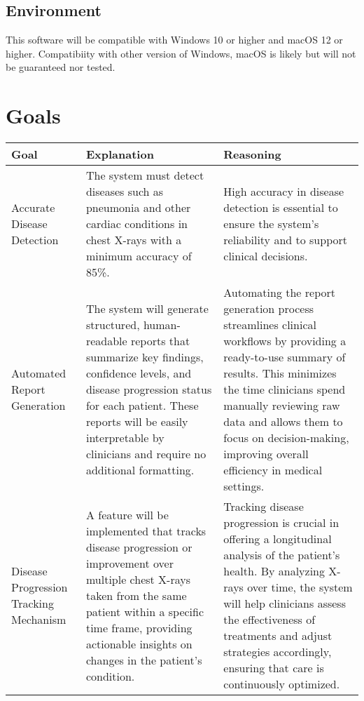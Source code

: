 \documentclass{article}
\begin{document}
\subsection{Environment}
This software will be compatible with Windows 10 or higher and macOS 12 or higher. Compatibiity with other version of Windows, macOS is likely but will not be guaranteed nor tested.\\

\newpage
\section{Goals}
\begin{table}[H] %
    \hspace*{-2cm}
    \centering
    \begin{tabular}{|p{3cm}|p{6cm}|p{6cm}|}
    \hline
    \textbf{Goal} & \textbf{Explanation} & \textbf{Reasoning} \\ \hline
    Accurate Disease Detection & The system must detect diseases such as pneumonia and other cardiac conditions in chest X-rays with a minimum accuracy of 85\%. & High accuracy in disease detection is essential to ensure the system’s reliability and to support clinical decisions. \\ \hline

    Automated Report Generation & The system will generate structured, human-readable reports that summarize key findings, confidence levels, and disease progression status for each patient. These reports will be easily interpretable by clinicians and require no additional formatting. & Automating the report generation process streamlines clinical workflows by providing a ready-to-use summary of results. This minimizes the time clinicians spend manually reviewing raw data and allows them to focus on decision-making, improving overall efficiency in medical settings. \\ \hline
    
    Disease Progression Tracking Mechanism & A feature will be implemented that tracks disease progression or improvement over multiple chest X-rays taken from the same patient within a specific time frame, providing actionable insights on changes in the patient’s condition. &Tracking disease progression is crucial in offering a longitudinal analysis of the patient's health. By analyzing X-rays over time, the system will help clinicians assess the effectiveness of treatments and adjust strategies accordingly, ensuring that care is continuously optimized.\\ \hline


\end{tabular}
\end{table}
\end{document}
